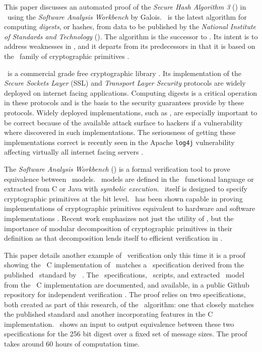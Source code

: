 This paper discusses an automated proof of the \emph{Secure Hash Algorithm 3} (\shaThree) in \openssl\ using the \emph{Software Analysis Workbench} by Galois.
\shaThree\ is the latest algorithm for computing \emph{digests}, or hashes, from data to be published by the \emph{National Institute of Standards and Technology} (\nist).
The algorithm is the successor to \shaTwo.
Its intent is to address weaknesses in \shaTwo, and it departs from its predecessors in that it is based on the \keccak\ family of cryptographic primitives \cite{fips202}.

\openssl\ is a commercial grade free cryptographic library \cite{openssl}.
Its implementation of the \emph{Secure Sockets Layer} (SSL) and \emph{Transport Layer Security} protocols are widely deployed on internet facing applications.
Computing digests is a critical operation in these protocols and is the basis to the security guarantees provide by these protocols.
Widely deployed implementations, such as \openssl, are especially important to be correct because of the available attack surface to hackers if a vulnerability where discovered in such implementations.
The seriousness of getting these implementations correct is recently seen in the Apache \texttt{log4j} vulnerability affecting virtually all internet facing servers \cite{log4j}.

The \emph{Software Analysis Workbench} (\saw) is a formal verification tool to prove equivalence between \sawcore\ models. \sawcore\ models are defined in the \cryptol\ functional language or extracted from C or Java with \emph{symbolic execution}.
\cryptol\ itself is designed to specify cryptographic primitives at the bit level.
\saw\ has been shown capable in proving implementations of cryptographic primitives equivalent to hardware and software implementations \cite{crypt-hi,hard-soft,design-verif}.
Recent work emphasizes not just the utility of \saw, but the importance of modular decomposition of cryptographic primitives in their definition as that decomposition lends itself to efficient verification in \saw \cite{nfm-us}. 

This paper details another example of \saw\ verification only this time it is a proof showing the \openssl\ C implementation of \shaThree\ matches a \cryptol\ specification derived from the published \fips\ standard by \nist\ \cite{fips202}.
The \cryptol\ specifications, \saw\ scripts, and extracted \sawcore\ model from the \openssl\ C implementation are documented, and available, in a public Github repository for independent verification \cite{repo}.
The proof relies on two specifications, both created as part of this research, of the \shaThree\ algorithm: one that closely matches the published standard and another incorporating features in the C implementation.
\saw\ shows an input to output equivalence between these two specifications for the 256 bit digest over a fixed set of message sizes. The proof takes around 60 hours of computation time.

